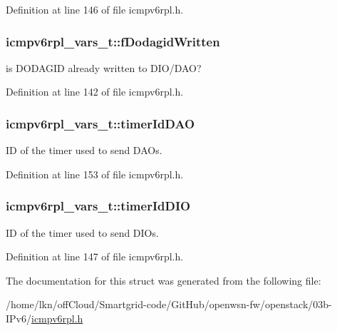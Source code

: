 Definition at line 146 of file icmpv6rpl.\+h.

\subsubsection[{\texorpdfstring{f\+Dodagid\+Written}{fDodagidWritten}}]{ icmpv6rpl\+\_\+vars\+\_\+t\+::f\+Dodagid\+Written}\hypertarget{structicmpv6rpl__vars__t_a0a845af4d8ccbba1ee88143cbfca457b}{}\label{structicmpv6rpl__vars__t_a0a845af4d8ccbba1ee88143cbfca457b}


is D\+O\+D\+A\+G\+ID already written to D\+I\+O/\+D\+AO? 



Definition at line 142 of file icmpv6rpl.\+h.

\subsubsection[{\texorpdfstring{timer\+Id\+D\+AO}{timerIdDAO}}]{ icmpv6rpl\+\_\+vars\+\_\+t\+::timer\+Id\+D\+AO}\hypertarget{structicmpv6rpl__vars__t_acfb6fe103149a40cb3644e81c70a7494}{}\label{structicmpv6rpl__vars__t_acfb6fe103149a40cb3644e81c70a7494}


ID of the timer used to send D\+A\+Os. 



Definition at line 153 of file icmpv6rpl.\+h.

\subsubsection[{\texorpdfstring{timer\+Id\+D\+IO}{timerIdDIO}}]{ icmpv6rpl\+\_\+vars\+\_\+t\+::timer\+Id\+D\+IO}\hypertarget{structicmpv6rpl__vars__t_a4720bd05e1417c23e0f25d1d5f8e5b83}{}\label{structicmpv6rpl__vars__t_a4720bd05e1417c23e0f25d1d5f8e5b83}


ID of the timer used to send D\+I\+Os. 



Definition at line 147 of file icmpv6rpl.\+h.



The documentation for this struct was generated from the following file\+:\begin{DoxyCompactItemize}
\item 
/home/lkn/off\+Cloud/\+Smartgrid-\/code/\+Git\+Hub/openwsn-\/fw/openstack/03b-\/\+I\+Pv6/\hyperlink{icmpv6rpl_8h}{icmpv6rpl.\+h}\end{DoxyCompactItemize}
